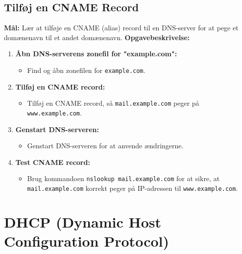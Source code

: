 \subsection{Tilføj en CNAME Record}
\textbf{Mål:} Lær at tilføje en CNAME (alias) record til en DNS-server for at pege et domænenavn til et andet domænenavn.
\newline\newline\noindent
\textbf{Opgavebeskrivelse:}
\begin{enumerate}
	\item \textbf{Åbn DNS-serverens zonefil for "example.com":}
	\begin{itemize}
		\item Find og åbn zonefilen for \texttt{example.com}.
	\end{itemize}
	\item \textbf{Tilføj en CNAME record:}
	\begin{itemize}
		\item Tilføj en CNAME record, så \texttt{mail.example.com} peger på \texttt{www.example.com}.
	\end{itemize}
	\item \textbf{Genstart DNS-serveren:}
	\begin{itemize}
		\item Genstart DNS-serveren for at anvende ændringerne.
	\end{itemize}
	\item \textbf{Test CNAME record:}
	\begin{itemize}
		\item Brug kommandoen \texttt{nslookup mail.example.com} for at sikre, at \texttt{mail.example.com} korrekt peger på IP-adressen til \texttt{www.example.com}.
	\end{itemize}
\end{enumerate}

\section{DHCP (Dynamic Host Configuration Protocol)}
